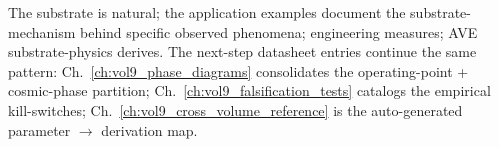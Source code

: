 The substrate is natural; the application examples document the substrate-mechanism behind specific observed phenomena; engineering measures; AVE substrate-physics derives. The next-step datasheet entries continue the same pattern: Ch.~\ref{ch:vol9_phase_diagrams} consolidates the operating-point + cosmic-phase partition; Ch.~\ref{ch:vol9_falsification_tests} catalogs the empirical kill-switches; Ch.~\ref{ch:vol9_cross_volume_reference} is the auto-generated parameter $\to$ derivation map.
%
%
